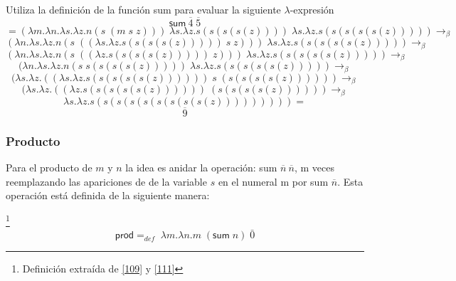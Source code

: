         \begin{exercise}
            Utiliza la definición de la función \textsf{sum} para evaluar la siguiente  $\lambda$-expresión
            \[
                \textsf{sum}\  \overline{4} \; \overline{5} 
            \]
            \[
                = (\lambda m.\lambda n.\lambda s.\lambda z.n(s \; (m\;s\;z))) \; \lambda s.\lambda z.s(s(s(s(z)))) \; \lambda s.\lambda z.s(s(s(s(s(z))))) \rightarrow_\beta 
            \]
	     \[
                (\lambda n.\lambda s.\lambda z.n(s \; ((\lambda s.\lambda z.s(s(s(s(z)))))\;s\;z))) \; \lambda s.\lambda z.s(s(s(s(s(z))))) \rightarrow_\beta 
            \]
		\[
                (\lambda n.\lambda s.\lambda z.n(s \; ((\lambda z.s(s(s(s(z)))))\;z))) \; \lambda s.\lambda z.s(s(s(s(s(z))))) \rightarrow_\beta 
            \]
		\[
                (\lambda n.\lambda s.\lambda z.n(s \; s(s(s(s(z))))) \; \lambda s.\lambda z.s(s(s(s(s(z))))) \rightarrow_\beta 
            \]
		\[
                (\lambda s.\lambda z.((\lambda s.\lambda z.s(s(s(s(s(z))))))\; s \; (s(s(s(s(z)))))) \rightarrow_\beta 
            \]
		\[
                (\lambda s.\lambda z.((\lambda z.s(s(s(s(s(z)))))) \; (s(s(s(s(z)))))) \rightarrow_\beta 
            \]
		\[
                \lambda s.\lambda z.s(s(s(s(s(s(s(s(s(z))))))))) = 
            \]
		\[
			\overline{9}
		\]
          
        \end{exercise}

        \subsubsection{Producto}
        Para el producto de $m$ y $n$ la idea es anidar la operación: \textsf{sum} $\overline{n}\ \overline{n}$, m veces reemplazando las apariciones de de la variable $s$ en el numeral m por \textsf{sum} $\overline{n}$. Esta operación está definida de la siguiente manera:

        \begin{definition}\footnote{Definición extraída de \hyperlink{109}{[109]} y  \hyperlink{111}{[111]}}
            $$\textsf{prod} =_{def}  \; \lambda m.\lambda n.m\; (\textsf{sum}\;n) \;  \bar{0}$$
        \end{definition}


